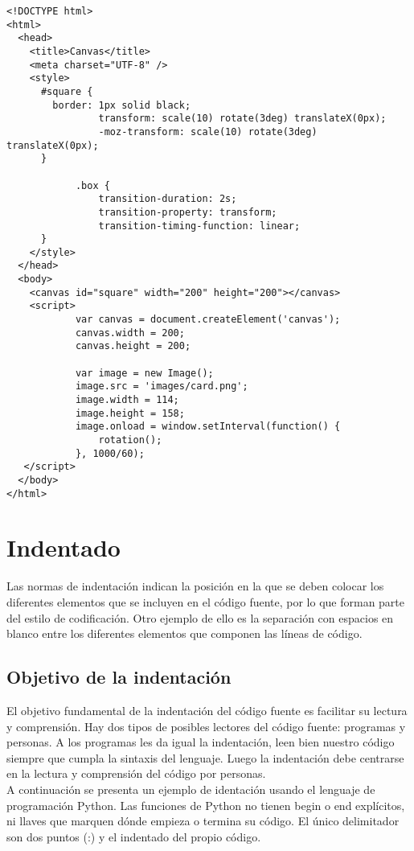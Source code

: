 \begin{lstlisting}
<!DOCTYPE html>
<html>
  <head>
    <title>Canvas</title>
    <meta charset="UTF-8" />
    <style>
      #square {
        border: 1px solid black;
                transform: scale(10) rotate(3deg) translateX(0px);
                -moz-transform: scale(10) rotate(3deg) translateX(0px);
      }

            .box {              
                transition-duration: 2s;
                transition-property: transform;
                transition-timing-function: linear;
      }
    </style>
  </head>
  <body>
    <canvas id="square" width="200" height="200"></canvas>
    <script>
            var canvas = document.createElement('canvas');
            canvas.width = 200;
            canvas.height = 200;

            var image = new Image();
            image.src = 'images/card.png';
            image.width = 114;
            image.height = 158;
            image.onload = window.setInterval(function() {
                rotation();
            }, 1000/60);
   </script>
  </body>
</html>
    \end{lstlisting}

\section{Indentado}

Las normas de indentaci\'on indican la posici\'on en la que se deben colocar los diferentes elementos que se incluyen en el c\'odigo fuente, por lo que forman parte del estilo de codificaci\'on. Otro ejemplo de ello es la separaci\'on con espacios en blanco entre los diferentes elementos que componen las l\'ineas de c\'odigo.

\subsection{Objetivo de la indentaci\'on}

El objetivo fundamental de la indentaci\'on del c\'odigo fuente es facilitar su lectura y comprensi\'on. Hay dos tipos de posibles lectores del c\'odigo fuente: programas y personas. A los programas les da igual la indentaci\'on, leen bien nuestro c\'odigo siempre que cumpla la sintaxis del lenguaje. Luego la indentaci\'on debe centrarse en la lectura y comprensi\'on del c\'odigo por personas.\\

A continuaci\'on se presenta un ejemplo de identaci\'on usando el lenguaje de programaci\'on Python. Las funciones de Python no tienen begin o end expl\'icitos, ni llaves que marquen d\'onde empieza o termina su c\'odigo. El \'unico delimitador son dos puntos (:) y el indentado del propio c\'odigo.\\

